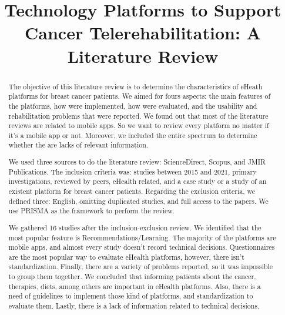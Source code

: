 \documentclass[conference]{IEEEtran}
\begin{document}
\title{Technology Platforms to Support Cancer Telerehabilitation: A Literature Review}

\author{
}

\maketitle

\begin{abstract}
The objective of this literature review is to determine the characteristics of eHeath platforms for breast cancer patients. We aimed for fours aspects: the main features of the platforms, how were implemented, how were evaluated, and the usability and rehabilitation problems that were reported. We found out that most of the literature reviews are related to mobile apps. So we want to review every platform no matter if it's a mobile app or not. Moreover, we included the entire spectrum to determine whether the are lacks of relevant information.

We used three sources to do the literature review: ScienceDirect, Scopus, and JMIR Publications. The inclusion criteria was: studies between 2015 and 2021, primary investigations, reviewed by peers, eHealth related, and a case study or a study of an existent platform for breast cancer patients. Regarding the exclusion criteria, we defined three: English, omitting duplicated studies, and full access to the papers. We use PRISMA as the framework to perform the review.

We gathered 16 studies after the inclusion-exclusion review. We identified that the most popular feature is Recommendations/Learning. The majority of the platforms are mobile apps, and almost every study doesn't record technical decisions. Questionnaires are the most popular way to evaluate eHealth platforms, however, there isn't standardization. Finally, there are a variety of problems reported, so it was impossible to group them together. We concluded that informing patients about the cancer, therapies, diets, among others are important in eHealth platforms. Also, there is a need of guidelines to implement those kind of platforms, and standardization to evaluate them. Lastly, there is a lack of information related to technical decisions.
\end{abstract}
\end{document}
